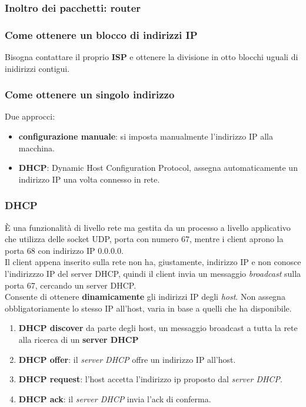 \subsubsection{Inoltro dei pacchetti: router}

\subsubsection{Come ottenere un blocco di indirizzi IP}
Bisogna contattare il proprio \textbf{ISP} e ottenere la divisione in otto blocchi uguali di inidirizzi contigui. 

\subsubsection{Come ottenere un singolo indirizzo}
Due approcci:
\begin{itemize}
  \item \textbf{configurazione manuale}: si imposta manualmente l'indirizzo IP alla macchina. 
  \item \textbf{DHCP}: Dynamic Host Configuration Protocol, assegna automaticamente un indirizzo IP una volta connesso in rete.  
\end{itemize}

\subsubsection*{DHCP}
È una funzionalità di livello rete ma gestita da un processo a livello applicativo che utilizza delle socket UDP, porta con numero 67, mentre i client aprono la porta 68 con indirizzo IP $0.0.0.0$. \\ 
Il client appena inserito sulla rete non ha, giustamente, indirizzo IP e non conosce l'indirizzzo IP del server DHCP, quindi il client invia un messaggio \textit{broadcast} sulla porta 67, cercando un server DHCP. \\ 
Consente di ottenere \textbf{dinamicamente} gli indirizzi IP degli \textit{host}. Non assegna obbligatoriamente lo stesso IP all'host, varia in base a quelli che ha disponibile. \\ 
\begin{enumerate}
  \item \textbf{DHCP discover} da parte degli host, un messaggio broadcast a tutta la rete alla ricerca di un \textbf{server DHCP} 
  \item \textbf{DHCP offer}: il \textit{server DHCP} offre un indirizzo IP all'host. 
  \item \textbf{DHCP request}: l'host accetta l'indirizzo ip proposto dal \textit{server DHCP}. 
  \item \textbf{DHCP ack}: il \textit{server DHCP} invia l'ack di conferma. 
\end{enumerate}

